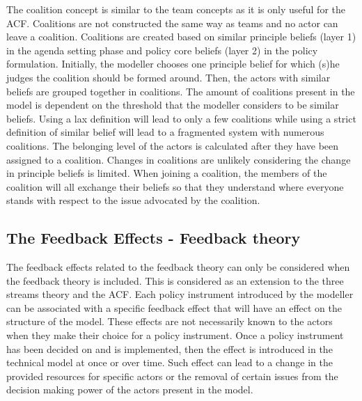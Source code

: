 The coalition concept is similar to the team concepts as it is only useful for the ACF. Coalitions are not constructed the same way as teams and no actor can leave a coalition. Coalitions are created based on similar principle beliefs (layer 1) in the agenda setting phase and policy core beliefs (layer 2) in the policy formulation. Initially, the modeller chooses one principle belief for which (s)he judges the coalition should be formed around. Then, the actors with similar beliefs are grouped together in coalitions. The amount of coalitions present in the model is dependent on the threshold that the modeller considers to be similar beliefs. Using a lax definition will lead to only a few coalitions while using a strict definition of similar belief will lead to a fragmented system with numerous coalitions. The belonging level of the actors is calculated after they have been assigned to a coalition. Changes in coalitions are unlikely considering the change in principle beliefs is limited. When joining a coalition, the members of the coalition will all exchange their beliefs so that they understand where everyone stands with respect to the issue advocated by the coalition.

%
\subsection{The Feedback Effects - Feedback theory}
\label{ssec:feedbackEffectsFeedback}

The feedback effects related to the feedback theory can only be considered when the feedback theory is included. This is considered as an extension to the three streams theory and the ACF. Each policy instrument introduced by the modeller can be associated with a specific feedback effect that will have an effect on the structure of the model. These effects are not necessarily known to the actors when they make their choice for a policy instrument. Once a policy instrument has been decided on and is implemented, then the effect is introduced in the technical model at once or over time. Such effect can lead to a change in the provided resources for specific actors or the removal of certain issues from the decision making power of the actors present in the model.
 
